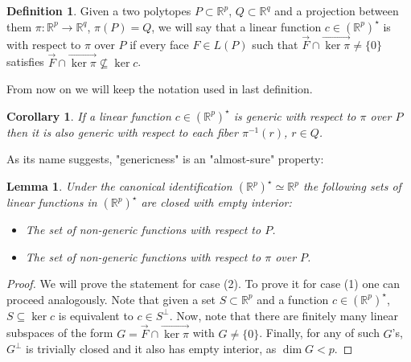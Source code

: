 \documentclass[10pt,a4paper]{article}
\let\emph\relax %
\newcommand{\RR}{\mathbb{R}}
\theoremstyle{plain}
\newtheorem{lemma}{Lemma}
\newtheorem{corollary}{Corollary}
\theoremstyle{remark}
\theoremstyle{definition}
\newtheorem{definition}{Definition}
\begin{document}
\begin{definition} 
	Given a two polytopes $P\subset \RR^p$, $Q\subset \RR^q$ 
	and a projection between them $\pi: \RR^p \rightarrow \RR^q$, $\pi(P)=Q$, 
	we will say that a linear function $c\in (\RR^p)^\star$ is \emph{generic} with respect to $\pi$ over $P$ 
	if every face $F\in L(P)$ such that $\overrightarrow{F}\cap \overrightarrow{\ker \pi} \neq \{0\}$
	satisfies $\overrightarrow{F}\cap \overrightarrow{\ker \pi} \nsubseteq \ker c$.
\end{definition}

From now on we will keep the notation used in last definition. 

\begin{corollary} 
	If a linear function $c\in (\RR^ p)^\star$ is generic with respect to 
	$\pi$ over $P$ then it is also generic with respect to each fiber $\pi^ {-1}(r)$, $r\in Q$.
\end{corollary}


As its name suggests, "genericness" is an "almost-sure" property:

\begin{lemma} 
	Under the canonical identification $(\RR^ p)^\star \simeq \RR ^p$ 
	the following sets of linear functions in $(\RR^ p)^\star$ are closed with empty interior: 
	\begin{itemize}
		\item[(1)] The set of non-generic functions with respect to $P$.
		\item[(2)] The set of non-generic functions with respect to $\pi$ over $P$.
	\end{itemize}
\end{lemma}
\begin{proof}
	We will prove the statement for case (2). 
	To prove it for case (1) one can proceed analogously.
	Note that given a set $S\subset \RR^p$ and a function 
	$c\in (\RR^p)^\star$, $S\subseteq \ker c$ is equivalent to $c\in S^\perp$. 
	Now, note that there are finitely many linear subspaces  of the form 
	$G=\overrightarrow{F}\cap \overrightarrow{\ker \pi}$ with $G\neq \{0\}$.
	Finally, for any of such $G$'s, 
	$G^\perp$ is trivially closed and it also has empty interior, as $\dim G < p$.  
\end{proof}


%
\end{document}

